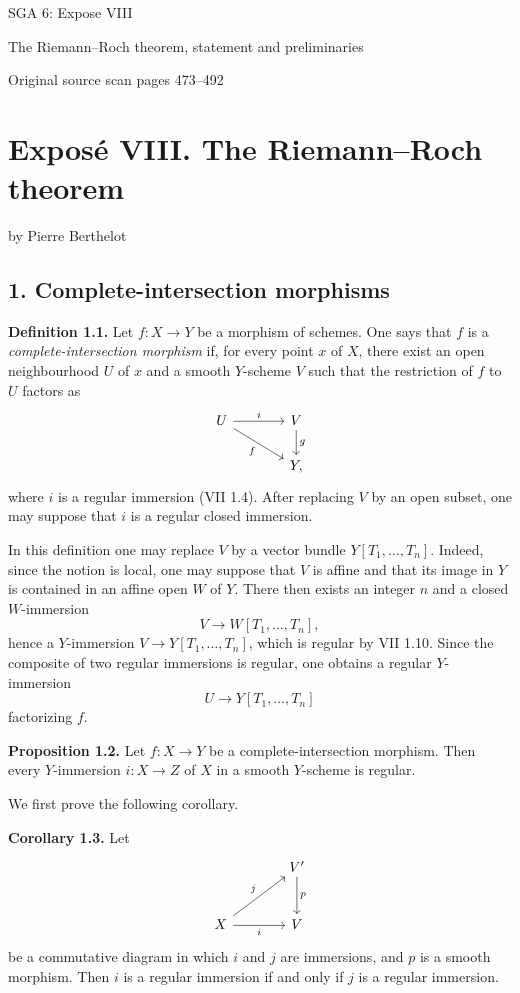 \documentclass[11pt]{article}
\begin{document}
\begin{center}
{\Large SGA 6: Expose VIII}\par
{\large The Riemann--Roch theorem, statement and preliminaries}\par
{\large Original source scan pages 473--492}
\end{center}


\section*{Expos\'e VIII. The Riemann--Roch theorem}
\begin{center}
by Pierre Berthelot
\end{center}

\subsection*{1. Complete-intersection morphisms}

\textbf{Definition 1.1.} Let $f:X\to Y$ be a morphism of schemes. One says that $f$ is a \emph{complete-intersection morphism} if, for every point $x$ of $X$, there exist an open neighbourhood $U$ of $x$ and a smooth $Y$-scheme $V$ such that the restriction of $f$ to $U$ factors as
\[
\begin{tikzcd}[column sep=large]
U \arrow[r,"i"] \arrow[dr,"f"'] & V \arrow[d,"g"]\\
& Y,
\end{tikzcd}
\]
where $i$ is a regular immersion (VII 1.4). After replacing $V$ by an open subset, one may suppose that $i$ is a regular closed immersion.

In this definition one may replace $V$ by a vector bundle $Y[T_1,\ldots,T_n]$. Indeed, since the notion is local, one may suppose that $V$ is affine and that its image in $Y$ is contained in an affine open $W$ of $Y$. There then exists an integer $n$ and a closed $W$-immersion
\[
V\longrightarrow W[T_1,\ldots,T_n],
\]
hence a $Y$-immersion $V\to Y[T_1,\ldots,T_n]$, which is regular by VII 1.10. Since the composite of two regular immersions is regular, one obtains a regular $Y$-immersion
\[
U\longrightarrow Y[T_1,\ldots,T_n]
\]
factorizing $f$.

\textbf{Proposition 1.2.} Let $f:X\to Y$ be a complete-intersection morphism. Then every $Y$-immersion $i:X\to Z$ of $X$ in a smooth $Y$-scheme is regular.

We first prove the following corollary.

\textbf{Corollary 1.3.} Let
\[
\begin{tikzcd}[column sep=large,row sep=large]
& V' \arrow[d,"p"]\\
X \arrow[ur,"j"] \arrow[r,"i"'] & V
\end{tikzcd}
\]
be a commutative diagram in which $i$ and $j$ are immersions, and $p$ is a smooth morphism. Then $i$ is a regular immersion if and only if $j$ is a regular immersion.
\end{document}

